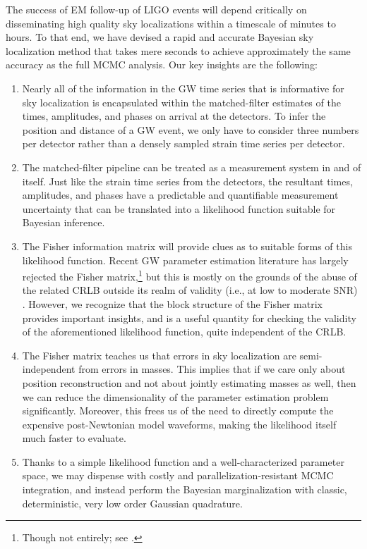 \documentclass[amsmath,amssymb,aps,prx,reprint,nopreprintnumbers,nofootinbib]{revtex4-1}
\begin{document}
The success of \ac{EM} follow\nobreakdashes-up of \ac{LIGO} events will depend critically on disseminating high quality sky localizations within a timescale of minutes to hours. To that end, we have devised a rapid and accurate Bayesian sky localization method that takes mere seconds to achieve approximately the same accuracy as the full \ac{MCMC} analysis. Our key insights are the following:
%
\begin{enumerate}
    \item Nearly all of the information in the \ac{GW} time series that is informative for sky localization is encapsulated within the matched\nobreakdashes-filter estimates of the times, amplitudes, and phases on arrival at the detectors. To infer the position and distance of a \ac{GW} event, we only have to consider three numbers per detector rather than a densely sampled strain time series per detector.
    \item The matched\nobreakdashes-filter pipeline can be treated as a measurement system in and of itself. Just like the strain time series from the detectors, the resultant times, amplitudes, and phases have a predictable and quantifiable measurement uncertainty that can be translated into a likelihood function suitable for Bayesian inference.
    \item The Fisher information matrix will provide clues as to suitable forms of this likelihood function. Recent \ac{GW} parameter estimation literature has largely rejected the Fisher matrix,\footnote{Though not entirely; see \cite{EffectiveFisherMatrix}.} but this is mostly on the grounds of the abuse of the related \ac{CRLB} outside its realm of validity (i.e., at low to moderate \ac{SNR}) \cite{BayesianBounds,UseAbuseFisherMatrix,FisherMatrixAsymptoticExpansions,InadequaciesFisherMatrix}. However, we recognize that the block structure of the Fisher matrix provides important insights, and is a useful quantity for checking the validity of the aforementioned likelihood function, quite independent of the \ac{CRLB}.
    \item The Fisher matrix teaches us that errors in sky localization are semi\nobreakdashes-independent from errors in masses. This implies that if we care only about position reconstruction and not about jointly estimating masses as well, then we can reduce the dimensionality of the parameter estimation problem significantly. Moreover, this frees us of the need to directly compute the expensive post-Newtonian model waveforms, making the likelihood itself much faster to evaluate.
    \item Thanks to a simple likelihood function and a well\nobreakdashes-characterized parameter space, we may dispense with costly and parallelization\nobreakdashes-resistant \ac{MCMC} integration, and instead perform the Bayesian marginalization with classic, deterministic, very low order Gaussian quadrature.

\end{enumerate}
\end{document}
